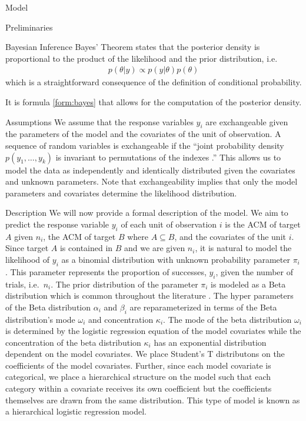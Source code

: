 \begin{chapter}{Model}
\begin{section}{Preliminaries}
\begin{subsection}{Bayesian Inference}
    Bayes' Theorem states that the posterior density is proportional to the product
    of the likelihood and the prior distribution, i.e.\
    \begin{align}\label{form:bayes}
      p(\theta | y) \propto p(y | \theta) p(\theta)
    \end{align}
    which is a straightforward consequence of the definition of conditional probability.

    It is formula \ref{form:bayes} that allows for the computation of the posterior density.
  \end{subsection}
\end{section}

\begin{section}{Assumptions}
  We assume that the response variables $y_i$ are exchangeable given the parameters of the model
  and the covariates of the unit of observation. A sequence of random variables
  is exchangeable if the ``joint probability density $p(y_1, \dots, y_k)$ is invariant to permutations of the indexes \cite{bda3}.''
  This allows us to model the data as independently and identically distributed given the covariates and unknown parameters.
  Note that exchangeability implies that only the model parameters and covariates determine the likelihood distribution.
\end{section}

\begin{section}{Description}
  We will now provide a formal description of the model.
  We aim to predict the response variable $y_i$ of each unit of
  observation $i$ is the ACM of target $A$ given $n_i$, the ACM of target $B$ where $A \subseteq B$,
  and the covariates of the unit $i$. Since target $A$ is
  contained in $B$ and we are given $n_i$, it is natural to model the likelihood of
  $y_i$ as a binomial distribution with unknown probability parameter $\pi_i$. This parameter
  represents the proportion of successes, $y_i$, given the number of trials, i.e.\ $n_i$.
  The prior distribution of the parameter $\pi_i$ is modeled as a Beta distribution which
  is common throughout the literature \cite{bda3, kruschke}.
  The hyper parameters of the Beta distribution $\alpha_i$ and $\beta_i$ are reparameterized in terms of the Beta distribution's
  mode $\omega_i$ and concentration $\kappa_i$.
  The mode of the beta distribution $\omega_i$ is determined by the logistic regression equation
  of the model covariates while
  the concentration of the beta distribution $\kappa_i$ has an exponential distribution dependent on the model covariates.
  We place Student's T distributons on the coefficients of the model covariates. Further, since each model covariate is categorical,
  we place a hierarchical structure on the model such that each category within a covariate receives its own coefficient
  but the coefficients themselves are drawn from the same distribution. This type of model is known as a hierarchical logistic regression model.


\end{section}
\end{chapter}
